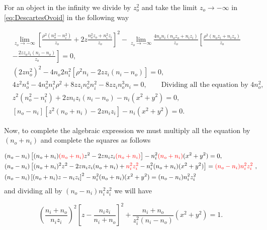             For an object in the infinity we divide by $z_o^2$ and take the limit $z_o\to -\infty$ in \ref{eq:DescartesOvoid} in the following way

            \begin{align*}
                & \lim_{z_o\to-\infty} \left[ \frac{\rho^2 \left( n_o^2-n_i^2 \right)}{z_o} + 2z \frac{n_o^2z_o + n_i^2z_i}{z_o} \right]^2 - \lim_{z_o\to-\infty} \frac{4n_on_i \left( n_oz_o + n_iz_i \right)}{z_o}\left[ \frac{\rho^2 \left( n_oz_i + n_iz_o \right)}{z_o} \right.\\
                & \left. - \frac{2zz_oz_i(n_i-n_o)}{z_o} \right] = 0,\\
                & (2zn_o^2)^2 - 4n_o2n_i^2\left[ \rho^2 n_i - 2zz_i(n_i-n_o) \right] = 0,\\
                & 4z^2n_o^4 - 4n_o^2n_i^2\rho^2 + 8zz_in_o^2n_i^2 - 8zz_in_o^3n_i = 0, \qquad \text{Dividing all the equation by $4n_o^2$},\\
                & z^2\left( n_o^2-n_i^2 \right) + 2zn_iz_i(n_i-n_o) - n_i (x^2+y^2) = 0,\\
                & \left[ n_o-n_i \right] \left[ z^2\left( n_o+n_i \right) - 2zn_iz_i \right] - n_i(x^2+y^2) = 0.
            \end{align*}

            Now, to complete the algebraic expression we must multiply all the equation by $(n_o+n_i)$ and complete the squares as follows 

            \begin{align*}
                & (n_o-n_i)\left[(n_o+n_i)\text{\color{red}$(n_o+n_i)$}  z^2 - 2zn_iz_i \text{\color{red}$(n_o+n_i)$}\right] - n_i^2 \text{\color{red}$(n_o+n_i)$} (x^2+y^2) = 0,\\
                & (n_o-n_i)\left[ (n_o+n_i)^2z^2 - 2zn_iz_i(n_o+n_i) + \text{\color{red} $n_i^2z_i^2$} - n_i^2(n_o+n_i)(x^2+y^2) \right] = \text{\color{red} $(n_o-n_i)n_i^2z_i^2$ },\\
                & (n_o-n_i) \left[(n_o+n_i)z-n_iz_i\right]^2 - n_i^2(n_o+n_i)(x^2+y^2) = (n_o-n_i)n_i^2z_i^2
            \end{align*}
            and dividing all by $(n_o-n_i)n_i^2z_i^2$ we will have

            \begin{equation}\label{eq:ConicalDiopter}
                \left( \frac{n_i+n_o}{n_iz_i} \right)^2 \left[ z - \frac{n_iz_i}{n_i+n_o} \right]^2 + \frac{n_i+n_o}{z_i^2(n_i-n_o)}(x^2+y^2) = 1.
            \end{equation}

